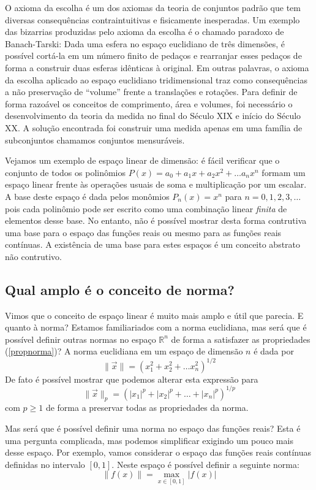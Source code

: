 O axioma da escolha é um dos axiomas da teoria de conjuntos padrão que tem diversas consequências contraintuitivas e fisicamente inesperadas. Um exemplo das bizarrias produzidas pelo axioma da escolha é o chamado paradoxo de Banach-Tarski: Dada uma esfera no espaço euclidiano de três dimensões, é possível cortá-la em um número finito de pedaços e rearranjar esses pedaços de forma a construir duas esferas idênticas à original. Em outras palavras, o axioma da escolha aplicado ao espaço euclidiano tridimensional traz como consequências a não preservação de ``volume'' frente a translações e rotações. Para definir de forma razoável os conceitos de comprimento, área e volumes, foi necessário o desenvolvimento da teoria da medida no final do Século XIX e início do Século XX. A solução encontrada foi construir uma medida apenas em uma família de subconjuntos chamamos conjuntos mensuráveis.      

Vejamos um exemplo de espaço linear de dimensão: é fácil verificar que o conjunto de todos os polinômios $P(x)=a_0+a_1x+a_2x^2+\ldots a_nx^n$ formam um espaço linear frente às operações usuais de soma e multiplicação por um escalar. A base deste espaço é dada pelos monômios $P_{n}(x)=x^n$ para $n=0,1,2,3,\ldots$ pois cada polinômio pode ser escrito como uma combinação linear \emph{finita} de elementos desse base. No entanto, não é possível mostrar desta forma contrutiva uma base para o espaço das funções reais ou mesmo para as funções reais contínuas. A existência de uma base para estes espaços é um conceito abstrato  não contrutivo.

\subsection{Qual amplo é o conceito de norma?}
Vimos que o conceito de espaço linear é muito mais amplo e útil que parecia. E quanto à norma? Estamos familiariados com a norma euclidiana, mas será que é possível definir outras normas no espaço $\mathbb{R}^n$ de forma a satisfazer as propriedades (\ref{propnorma})? A norma euclidiana em um espaço de dimensão $n$ é dada por
$$\|\vec{x}\|=\left(x_1^2+x_2^2+\ldots x_n^2\right)^{1/2}$$
De fato é possível mostrar que podemos alterar esta expressão para
$$\|\vec{x}\|_p=\left(|x_1|^p+|x_2|^p+\ldots +|x_n|^p\right)^{1/p}$$
com $p\geq 1$ de forma a preservar todas as propriedades da norma.

Mas será que é possível definir uma norma no espaço das funções reais? Esta é uma pergunta complicada, mas podemos simplificar exigindo um pouco mais desse espaço. Por exemplo, vamos considerar o espaço das funções reais contínuas definidas no intervalo $[0,1]$. Neste espaço é possível definir a seguinte norma:
\begin{equation}\label{norma_infinito}\|f(x)\|=\max_{x\in [0,1]}|f(x)|\end{equation}

